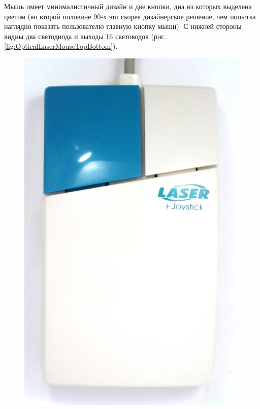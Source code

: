 \documentclass[11pt, a4paper]{article}
\begin{document}
Мышь имеет минималистичный дизайн и две кнопки, дна из которых выделена цветом (во второй половине 90-х это скорее дизайнерское решение, чем попытка наглядно показать пользователю главную кнопку мыши). С нижней стороны видны два светодиода и выходы 16 световодов (рис. \ref{fig:OpticalLaserMouseTopBottom}).

\begin{figure}[h]
    \centering
    \includegraphics[scale=0.4]{1996_hi-bon_laser_mouse/top_60.jpg}

\end{figure}
\end{document}
